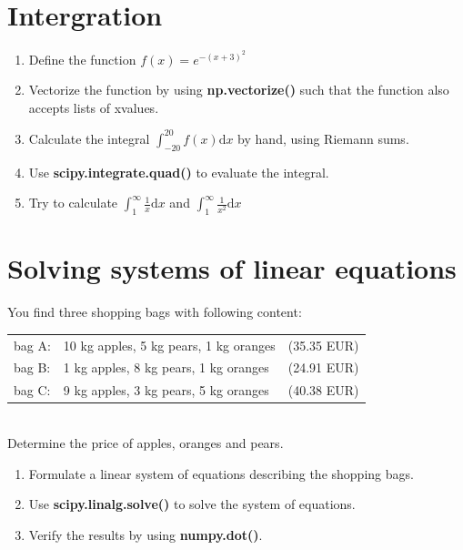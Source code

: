 \documentclass[smallheadings,12pt]{scrartcl}
\begin{document}
\section{Intergration}
\begin{enumerate}
  \item Define the function $f(x) = e^{-(x+3)^2}$
  \item Vectorize the function by using \textbf{np.vectorize()} such that 
the function also accepts lists of xvalues.
  \item Calculate the integral $\int_{-20}^{20} f(x)\mathrm{d}x$ by hand, using Riemann sums.
  \item Use \textbf{scipy.integrate.quad()} to evaluate the integral.
  \item Try to calculate $\int_{1}^{\infty} \frac1x \mathrm{d}x$ and $\int_1^\infty \frac1{x^2}\mathrm{d}x$
\end{enumerate}

\section{Solving systems of linear equations}
You find three shopping bags with following content:\\[.5em]
\begin{tabular}{lll}
	bag A: 	&10 kg apples, 5 kg pears, 1 kg oranges 	&(35.35 EUR) \\
	bag B:	&1 kg apples, 8 kg pears, 1 kg oranges	&(24.91 EUR) \\
	bag C: 	&9 kg apples, 3 kg pears, 5 kg oranges	&(40.38 EUR) \\
\end{tabular}
\\[.5em]
Determine the price of apples, oranges and pears.
\begin{enumerate}
  \item Formulate a linear system of equations describing the 	shopping bags.
  \item Use \textbf{scipy.linalg.solve()} to solve the system of equations.
  \item Verify the results by using \textbf{numpy.dot()}.
\end{enumerate}
\end{document}
